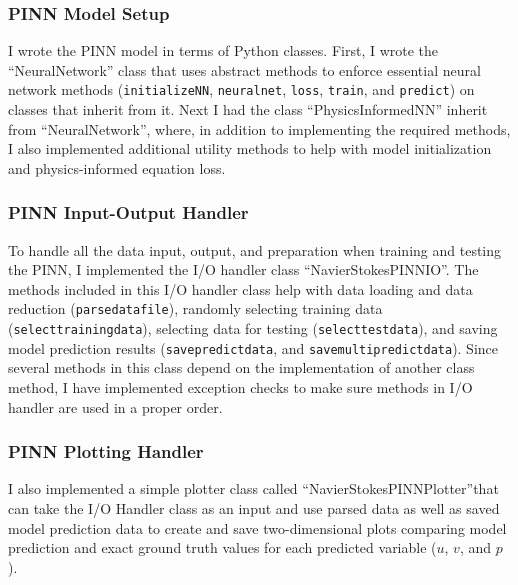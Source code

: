 \subsubsection{PINN Model Setup}
I wrote the PINN model in terms of Python classes. First, I wrote the ``NeuralNetwork'' class that uses abstract methods to enforce essential neural network methods (\texttt{initialize\textunderscore NN}, \texttt{neural\textunderscore net}, \texttt{loss}, \texttt{train}, and \texttt{predict}) on classes that inherit from it. Next I had the class ``PhysicsInformedNN'' inherit from ``NeuralNetwork'', where, in addition to implementing the required methods, I also implemented additional utility methods to help with model initialization and physics-informed equation loss.

\subsubsection{PINN Input-Output Handler}
To handle all the data input, output, and preparation when training and testing the PINN, I implemented the I/O handler class ``NavierStokesPINN\textunderscore IO''. The methods included in this I/O handler class help with data loading and data reduction (\texttt{parse\textunderscore data\textunderscore file}), randomly selecting training data (\texttt{select\textunderscore training\textunderscore data}), selecting data for testing (\texttt{select\textunderscore test\textunderscore data}), and saving model prediction results (\texttt{save\textunderscore predict\textunderscore data}, and \texttt{save\textunderscore multi\textunderscore predict\textunderscore data}). Since several methods in this class depend on the implementation of another class method, I have implemented exception checks to make sure methods in I/O handler are used in a proper order.

\subsubsection{PINN Plotting Handler}
I also implemented a simple plotter class called ``NavierStokesPINN\textunderscore Plotter''that can take the I/O Handler class as an input and use parsed data as well as saved model prediction data to create and save two-dimensional plots comparing model prediction and exact ground truth values for each predicted variable ($u$, $v$, and $p$).

